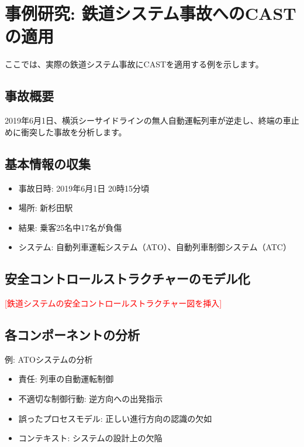 \section{事例研究: 鉄道システム事故へのCASTの適用}

ここでは、実際の鉄道システム事故にCASTを適用する例を示します。

\subsection{事故概要}

2019年6月1日、横浜シーサイドラインの無人自動運転列車が逆走し、終端の車止めに衝突した事故を分析します。

\subsection{基本情報の収集}

\begin{itemize}
    \item 事故日時: 2019年6月1日 20時15分頃
    \item 場所: 新杉田駅
    \item 結果: 乗客25名中17名が負傷
    \item システム: 自動列車運転システム（ATO）、自動列車制御システム（ATC）
\end{itemize}

\subsection{安全コントロールストラクチャーのモデル化}

\textcolor{red}{[鉄道システムの安全コントロールストラクチャー図を挿入]}

\subsection{各コンポーネントの分析}

例: ATOシステムの分析
\begin{itemize}
    \item 責任: 列車の自動運転制御
    \item 不適切な制御行動: 逆方向への出発指示
    \item 誤ったプロセスモデル: 正しい進行方向の認識の欠如
    \item コンテキスト: システムの設計上の欠陥
\end{itemize}

